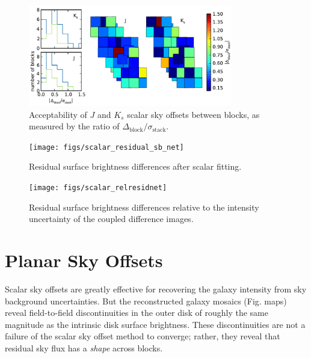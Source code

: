 \documentclass[iop]{emulateapj}
\newcommand{\todo}[1]{\textcolor{RedOrange}{#1}} %
\begin{document}
\begin{figure}[t]
    \centering
        \includegraphics[width=3.5in]{figs/offset_ratio_map_enhanced}
    \caption{Acceptability of $J$ and $K_s$ scalar sky offsets between blocks, as measured by the ratio of $\Delta_\mathrm{block}/\sigma_\mathrm{stack}$.}
    \label{fig:offset_ratio_map}
\end{figure}

\begin{figure}[t]
    \centering
        \texttt{[image: figs/scalar\_residual\_sb\_net]}
    \caption{Residual surface brightness differences after scalar fitting.}
    \label{fig:scalar_residual_sb_net}
\end{figure}

\begin{figure}[t]
    \centering
        \texttt{[image: figs/scalar\_relresidnet]}
    \caption{Residual surface brightness differences relative to the intensity uncertainty of the coupled difference images.}
    \label{fig:scalar_relresidnet}
\end{figure}

\section{Planar Sky Offsets}

Scalar sky offsets are greatly effective for recovering the galaxy intensity from sky background uncertainties. But the reconstructed galaxy mosaics (Fig. \todo{maps}) reveal field-to-field discontinuities in the outer disk of roughly the same magnitude as the intrinsic disk surface brightness. These discontinuities are not a failure of the scalar sky offset method to converge; rather, they reveal that residual sky flux has a \emph{shape} across blocks.
\end{document}
